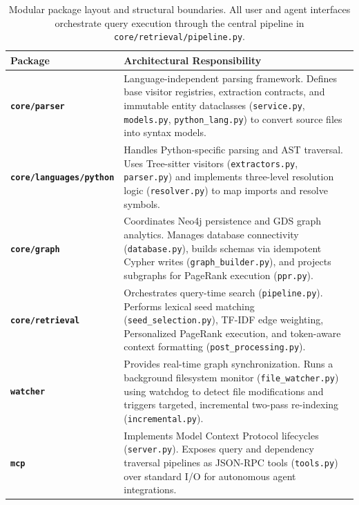 \begin{table}[H]
    \centering
    \footnotesize
    \caption[CodeGraph package structure and layout]{Modular package layout and structural boundaries. All user and agent interfaces orchestrate query execution through the central pipeline in \texttt{core/retrieval/pipeline.py}.}
    \label{tab:implementation-modules}
    \begin{tabularx}{\textwidth}{@{} >{\raggedright\arraybackslash}p{5.2cm} >{\raggedright\arraybackslash}X @{}}
        \toprule
        \rowcolor{black!6}
        \textbf{Package} & \textbf{Architectural Responsibility} \\
        \midrule
        \textbf{\texttt{core/parser}} &
        Language-independent parsing framework. Defines base visitor registries, extraction contracts, and immutable entity dataclasses (\texttt{service.py}, \texttt{models.py}, \texttt{python\_lang.py}) to convert source files into syntax models. \\
        \addlinespace[3pt]
        \textbf{\texttt{core/\allowbreak languages/\allowbreak python}} &
        Handles Python-specific parsing and AST traversal. Uses Tree-sitter visitors (\texttt{extractors.py}, \texttt{parser.py}) and implements three-level resolution logic (\texttt{resolver.py}) to map imports and resolve symbols. \\
        \addlinespace[3pt]
        \textbf{\texttt{core/graph}} &
        Coordinates Neo4j persistence and GDS graph analytics. Manages database connectivity (\texttt{database.py}), builds schemas via idempotent Cypher writes (\texttt{graph\_builder.py}), and projects subgraphs for PageRank execution (\texttt{ppr.py}). \\
        \addlinespace[3pt]
        \textbf{\texttt{core/retrieval}} &
        Orchestrates query-time search (\texttt{pipeline.py}). Performs lexical seed matching (\texttt{seed\_selection.py}), TF-IDF edge weighting, Personalized PageRank execution, and token-aware context formatting (\texttt{post\_processing.py}). \\
        \addlinespace[3pt]
        \textbf{\texttt{watcher}} &
        Provides real-time graph synchronization. Runs a background filesystem monitor (\texttt{file\_watcher.py}) using watchdog to detect file modifications and triggers targeted, incremental two-pass re-indexing (\texttt{incremental.py}). \\
        \addlinespace[3pt]
        \textbf{\texttt{mcp}} &
        Implements Model Context Protocol lifecycles (\texttt{server.py}). Exposes query and dependency traversal pipelines as JSON-RPC tools (\texttt{tools.py}) over standard I/O for autonomous agent integrations. \\

\end{tabularx}
\end{table}
